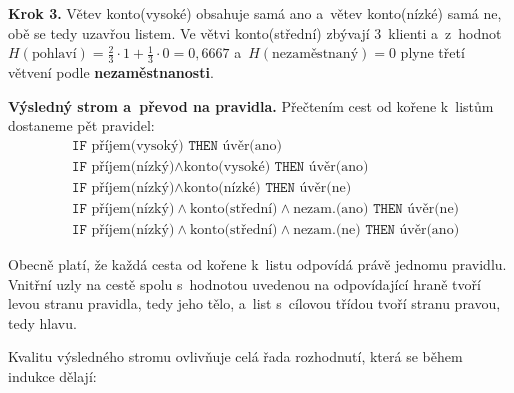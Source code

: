 \documentclass[11pt,a4paper]{article}
\theoremstyle{definition}
\begin{document}
\begin{defbox}
\textbf{Krok 3.} Větev konto(vysoké) obsahuje samá ano a~větev konto(nízké) samá ne, obě se
tedy uzavřou listem. Ve větvi konto(střední) zbývají 3~klienti a~z~hodnot
$H(\text{pohlaví})=\tfrac23\cdot 1+\tfrac13\cdot 0=0{,}6667$ a~$H(\text{nezaměstnaný})=0$
plyne třetí větvení podle \textbf{nezaměstnanosti}.

\textbf{Výsledný strom a~převod na pravidla.} Přečtením cest od kořene k~listům dostaneme
pět pravidel:
\begin{align*}
&\texttt{IF } \text{příjem(vysoký)} \texttt{ THEN } \text{úvěr(ano)}\\
&\texttt{IF } \text{příjem(nízký)}\wedge\text{konto(vysoké)} \texttt{ THEN } \text{úvěr(ano)}\\
&\texttt{IF } \text{příjem(nízký)}\wedge\text{konto(nízké)} \texttt{ THEN } \text{úvěr(ne)}\\
&\texttt{IF } \text{příjem(nízký)}\wedge\text{konto(střední)}\wedge\text{nezam.(ano)}
   \texttt{ THEN } \text{úvěr(ne)}\\
&\texttt{IF } \text{příjem(nízký)}\wedge\text{konto(střední)}\wedge\text{nezam.(ne)}
   \texttt{ THEN } \text{úvěr(ano)}
\end{align*}
\end{defbox}

Obecně platí, že každá cesta od kořene k~listu odpovídá právě jednomu pravidlu. Vnitřní uzly
na cestě spolu s~hodnotou uvedenou na odpovídající hraně tvoří levou stranu pravidla, tedy
jeho tělo, a~list s~cílovou třídou tvoří stranu pravou, tedy hlavu.

Kvalitu výsledného stromu ovlivňuje celá řada rozhodnutí, která se během indukce dělají:
\end{document}
